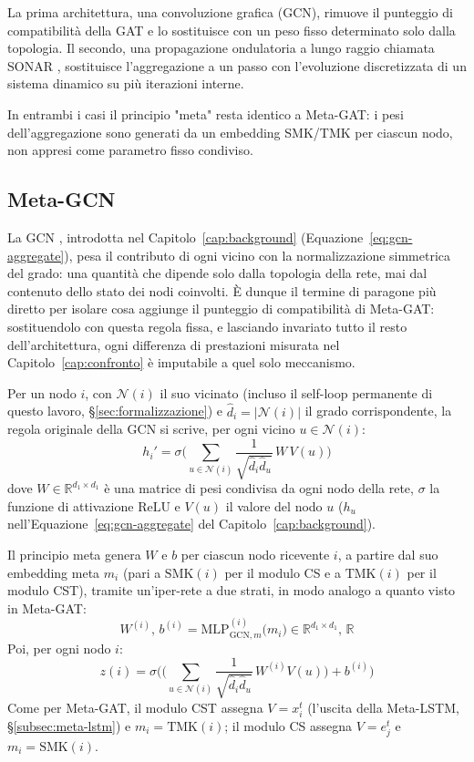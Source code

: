 La prima architettura, una convoluzione grafica (GCN), rimuove il punteggio di compatibilità della GAT e lo sostituisce
con un peso fisso determinato solo dalla topologia.
Il secondo, una propagazione ondulatoria a lungo raggio chiamata SONAR \citep{trenta2025sonar},
sostituisce l'aggregazione a un passo con l'evoluzione discretizzata di un sistema dinamico su più iterazioni interne.

In entrambi i casi il principio "meta" resta identico a Meta-GAT:
i pesi dell'aggregazione sono generati da un embedding SMK/TMK per ciascun nodo, non appresi come parametro fisso condiviso.

\subsection{Meta-GCN}
\label{subsec:meta-gcn}

La GCN \citep{kipf2017gcn}, introdotta nel Capitolo~\ref{cap:background}
(Equazione~\ref{eq:gcn-aggregate}), pesa il contributo di ogni vicino con la
normalizzazione simmetrica del grado: una quantità che dipende solo dalla
topologia della rete, mai dal contenuto dello stato dei nodi coinvolti. È
dunque il termine di paragone più diretto per isolare cosa aggiunge il
punteggio di compatibilità di Meta-GAT: sostituendolo con questa regola
fissa, e lasciando invariato tutto il resto dell'architettura, ogni
differenza di prestazioni misurata nel Capitolo~\ref{cap:confronto} è
imputabile a quel solo meccanismo.

Per un nodo $i$, con $\mathcal{N}(i)$ il suo vicinato (incluso il self-loop
permanente di questo lavoro, §\ref{sec:formalizzazione}) e $\hat d_i =
  |\mathcal{N}(i)|$ il grado corrispondente, la regola originale della GCN si
scrive, per ogni vicino $u \in \mathcal{N}(i)$:
\[
  h_i' = \sigma\Big(\sum_{u \in \mathcal{N}(i)} \frac{1}{\sqrt{\hat d_i \hat d_u}}\, W\, V(u)\Big)
\]
dove $W \in \mathbb{R}^{d_1 \times d_1}$ è una matrice di pesi condivisa da
ogni nodo della rete, $\sigma$ la funzione di attivazione $\mathrm{ReLU}$ e $V(u)$ il valore
del nodo $u$ ($h_u$ nell'Equazione~\ref{eq:gcn-aggregate} del Capitolo~\ref{cap:background}).

Il principio meta genera $W$ e $b$ per ciascun nodo ricevente $i$, a partire
dal suo embedding meta $m_i$ (pari a $\mathrm{SMK}(i)$ per il modulo CS e a
$\mathrm{TMK}(i)$ per il modulo CST), tramite un'iper-rete a due strati,
in modo analogo a quanto visto in Meta-GAT:
\[
  W^{(i)}, \, b^{(i)} = \mathrm{MLP}_{\mathrm{GCN},m}^{(i)}\big(m_i\big) \in \mathbb{R}^{d_1 \times d_1}, \, \mathbb{R}
\]
Poi, per ogni nodo $i$:
\begin{equation}
  z(i) = \sigma\Bigg(\bigg(\sum_{u \in \mathcal{N}(i)} \frac{1}{\sqrt{\hat d_i \hat d_u}}\, W^{(i)}V(u)\bigg) + b^{(i)}\Bigg)
  \label{eq:metagcn}
\end{equation}
Come per Meta-GAT, il modulo CST assegna $V=x_i^t$ (l'uscita della
Meta-LSTM, §\ref{subsec:meta-lstm}) e $m_i=\mathrm{TMK}(i)$; il modulo CS
assegna $V=e_j^t$ e $m_i=\mathrm{SMK}(i)$.

